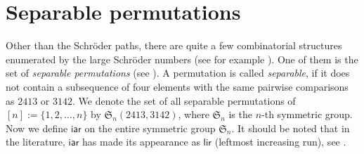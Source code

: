 \documentclass[11pt,reqno]{amsart}
\numberwithin{equation}{section}
\theoremstyle{plain}
\theoremstyle{definition}
\newtheorem{example}[theorem]{Example}
\def\iar{\mathsf{iar}}
\def\lir{\mathsf{lir}}
\begin{document}





\section{Separable permutations}\label{sec:comb pf sep}

Other than the Schr\"oder paths, there are quite a few combinatorial structures enumerated by the large Schr\"oder numbers (see for example \cite[Exercise 6.39]{StaEC2}). One of them is the set of \emph{separable permutations} (see \cite{SS,Wes,Kit}). A permutation is called \emph{separable}, if it does not contain a subsequence of four elements with the same pairwise comparisons as $2413$ or $3142$. We denote the set of all separable permutations of $[n]:=\{1,2,\ldots,n\}$ by $\mathfrak{S}_{n}(2413,3142)$, where $\mathfrak{S}_n$ is the $n$-th symmetric group. Now we define $\iar$ on the entire symmetric group $\mathfrak{S}_n$. It should be noted that in the literature, $\iar$ has made its appearance as $\lir$ (leftmost increasing run), see \cite[pp. 5]{CK}.
\end{document}
